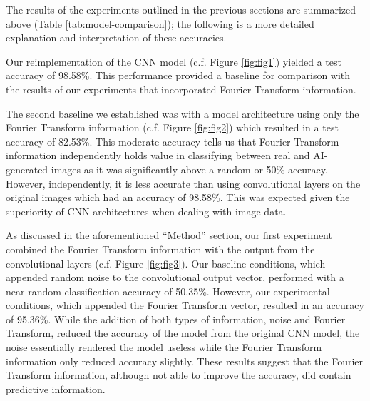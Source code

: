 The results of the experiments outlined in the previous sections are summarized above (Table \ref{tab:model-comparison}); the following is a more detailed explanation and interpretation of these accuracies.

Our reimplementation of the CNN model (c.f. Figure \ref{fig:fig1}) yielded a test accuracy of 98.58\%. This performance provided a baseline for comparison with the results of our experiments that incorporated Fourier Transform information.

The second baseline we established was with a model architecture using only the Fourier Transform information (c.f. Figure \ref{fig:fig2}) which resulted in a test accuracy of 82.53\%. This moderate accuracy tells us that Fourier Transform information independently holds value in classifying between real and AI-generated images as it was significantly above a random or 50\% accuracy. However, independently, it is less accurate than using convolutional layers on the original images which had an accuracy of 98.58\%. This was expected given the superiority of CNN architectures when dealing with image data.

As discussed in the aforementioned “Method” section, our first experiment combined the Fourier Transform information with the output from the convolutional layers (c.f. Figure \ref{fig:fig3}). Our baseline conditions, which appended random noise to the convolutional output vector, performed with a near random classification accuracy of 50.35\%. However, our experimental conditions, which appended the Fourier Transform vector, resulted in an accuracy of 95.36\%. While the addition of both types of information, noise and Fourier Transform, reduced the accuracy of the model from the original CNN model, the noise essentially rendered the model useless while the Fourier Transform information only reduced accuracy slightly. These results suggest that the Fourier Transform information, although not able to improve the accuracy, did contain predictive information.


